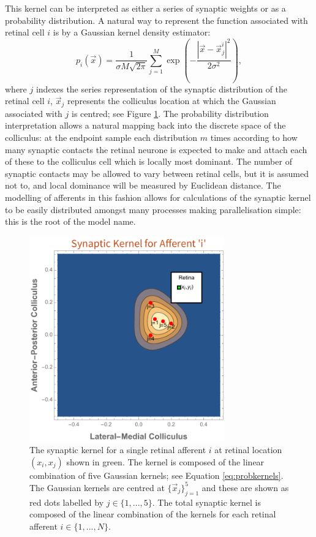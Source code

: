 This kernel can be interpreted as either a series of synaptic weights or as a probability distribution. A natural way to represent the function associated with retinal cell $i$ is by a Gaussian kernel density estimator:
\begin{equation}\label{eq:probkernels}
p_i(\vec{x}) = \frac{1}{\sigma M \sqrt{2 \pi}}\sum_{j=1}^{M} \exp\left(-\frac{\left|\vec{x} - \vec{x}^i_j\right|^2}{2\sigma^2}\right),
\end{equation}
where $j$ indexes the series representation of the synaptic distribution of the retinal cell $i$, $\vec{x}_j$ represents the colliculus location at which the Gaussian associated with $j$ is centred; see Figure \ref{fig:kernelexample}. The probability distribution interpretation allows a natural mapping back into the discrete space of the colliculus: at the endpoint sample each distribution $m$ times according to how many synaptic contacts the retinal neurone is expected to make and attach each of these to the colliculus cell which is locally most dominant. The number of synaptic contacts may be allowed to vary between retinal cells, but it is assumed not to, and local dominance will be measured by Euclidean distance. The modelling of afferents in this fashion allows for calculations of the synaptic kernel to be easily distributed amongst many processes making parallelisation simple: this is the root of the model name.
\begin{figure}[h]
	\centering
	\includegraphics[width=0.75\textwidth]{images/distributed_kernels/figure_kernelexample}
	\def\c{An example of a potential probability distribution of synpatic contacts for a given retinal afferent.}
	\caption[\c]{\label{fig:kernelexample} The synaptic kernel for a single retinal afferent $i$ at retinal location $(x_i, x_j)$ shown in green. The kernel is composed of the linear combination of five Gaussian kernels; see Equation \ref{eq:probkernels}. The Gaussian kernels are centred at $\{\vec{x}_j\}_{j=1}^5$ and these are shown as red dots labelled by $j \in \{1, ..., 5\}$. The total synaptic kernel is composed of the linear combination of the kernels for each retinal afferent $i \in \{1, ..., N \}$.}
\end{figure}
